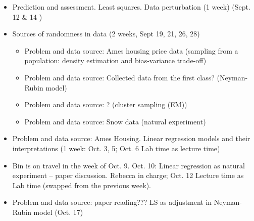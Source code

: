 \documentclass[11pt]{article}
\begin{document}
\begin{itemize}
\item Prediction and assessment. Least squares. Data perturbation (1 week) (Sept. 12 \& 14 )

\item Sources of randomness in data (2 weeks, Sept 19, 21, 26, 28) 
\begin{itemize}
\item Problem and data source: Ames housing price data
(sampling from a population: density estimation and bias-variance trade-off)

\item Problem and data source: Collected data from the first class?
(Neyman-Rubin model)

\item Problem and data source: ? 
(cluster sampling (EM))

\item Problem and data source: Snow data
(natural experiment)
\end{itemize}

\item 
Problem and data source: Ames Housing.
Linear regression models and their interpretations 
(1 week: Oct. 3, 5; Oct. 6 Lab time as lecture time)

\item Bin is on travel in the week of Oct. 9.
Oct. 10: Linear regression as natural experiment -- paper discussion. 
Rebecca in charge; Oct. 12 Lecture time as Lab time (swapped from the previous week).

\item Problem and data source: paper reading???
LS as adjustment in Neyman-Rubin model (Oct. 17)



\end{itemize}
\end{document}
